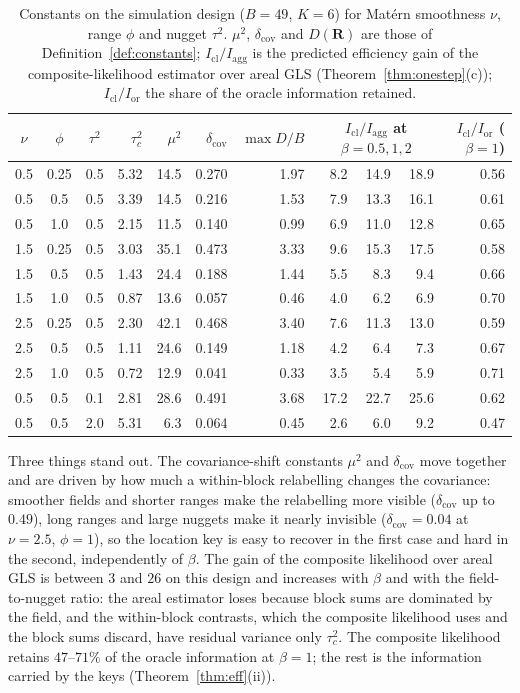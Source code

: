 \documentclass[11pt]{article}
\theoremstyle{definition}
\newcommand{\bR}{\mathbf{R}}
\newcommand{\agg}{\mathrm{agg}}
\newcommand{\orc}{\mathrm{or}}
\begin{document}
\begin{table}[t]\centering\small
\begin{tabular}{cccrrrrrrrr}\toprule
$\nu$ & $\phi$ & $\tau^2$ & $\tau_c^2$ & $\mu^2$ & $\delta_{\mathrm{cov}}$ & $\max D/B$ & \multicolumn{3}{c}{$I_{\mathrm{cl}}/I_\agg$ at $\beta=0.5,1,2$} & $I_{\mathrm{cl}}/I_\orc$ ($\beta=1$)\\\midrule
0.5 & 0.25 & 0.5 & 5.32 & 14.5 & 0.270 & 1.97 & 8.2 & 14.9 & 18.9 & 0.56\\
0.5 & 0.5  & 0.5 & 3.39 & 14.5 & 0.216 & 1.53 & 7.9 & 13.3 & 16.1 & 0.61\\
0.5 & 1.0  & 0.5 & 2.15 & 11.5 & 0.140 & 0.99 & 6.9 & 11.0 & 12.8 & 0.65\\
1.5 & 0.25 & 0.5 & 3.03 & 35.1 & 0.473 & 3.33 & 9.6 & 15.3 & 17.5 & 0.58\\
1.5 & 0.5  & 0.5 & 1.43 & 24.4 & 0.188 & 1.44 & 5.5 & 8.3 & 9.4 & 0.66\\
1.5 & 1.0  & 0.5 & 0.87 & 13.6 & 0.057 & 0.46 & 4.0 & 6.2 & 6.9 & 0.70\\
2.5 & 0.25 & 0.5 & 2.30 & 42.1 & 0.468 & 3.40 & 7.6 & 11.3 & 13.0 & 0.59\\
2.5 & 0.5  & 0.5 & 1.11 & 24.6 & 0.149 & 1.18 & 4.2 & 6.4 & 7.3 & 0.67\\
2.5 & 1.0  & 0.5 & 0.72 & 12.9 & 0.041 & 0.33 & 3.5 & 5.4 & 5.9 & 0.71\\
0.5 & 0.5  & 0.1 & 2.81 & 28.6 & 0.491 & 3.68 & 17.2 & 22.7 & 25.6 & 0.62\\
0.5 & 0.5  & 2.0 & 5.31 & 6.3 & 0.064 & 0.45 & 2.6 & 6.0 & 9.2 & 0.47\\\bottomrule
\end{tabular}
\caption{Constants on the simulation design ($B=49$, $K=6$) for Mat\'ern smoothness $\nu$, range $\phi$ and nugget $\tau^2$. $\mu^2$, $\delta_{\mathrm{cov}}$ and $D(\bR)$ are those of Definition~\ref{def:constants}; $I_{\mathrm{cl}}/I_\agg$ is the predicted efficiency gain of the composite-likelihood estimator over areal GLS (Theorem~\ref{thm:onestep}(c)); $I_{\mathrm{cl}}/I_\orc$ the share of the oracle information retained.}
\label{tab:constants}
\end{table}

Three things stand out. The covariance-shift constants $\mu^2$ and $\delta_{\mathrm{cov}}$ move together and are driven by how much a within-block relabelling changes the covariance: smoother fields and shorter ranges make the relabelling more visible ($\delta_{\mathrm{cov}}$ up to $0.49$), long ranges and large nuggets make it nearly invisible ($\delta_{\mathrm{cov}}=0.04$ at $\nu=2.5$, $\phi=1$), so the location key is easy to recover in the first case and hard in the second, independently of $\beta$. The gain of the composite likelihood over areal GLS is between $3$ and $26$ on this design and increases with $\beta$ and with the field-to-nugget ratio: the areal estimator loses because block sums are dominated by the field, and the within-block contrasts, which the composite likelihood uses and the block sums discard, have residual variance only $\tau_c^2$. The composite likelihood retains $47$--$71\%$ of the oracle information at $\beta=1$; the rest is the information carried by the keys (Theorem~\ref{thm:eff}(ii)).
\end{document}
